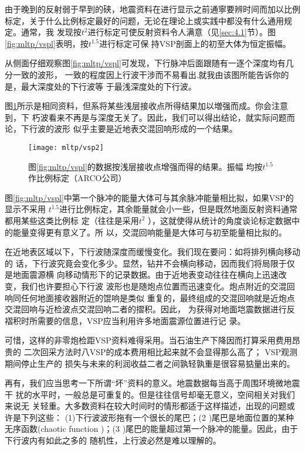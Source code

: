 由于晚到的反射弱于早到的硖，地震资料在进行显示之前通寧要辨时间而加以比例
标定，关于什么比例标定最好的问题，无论在理论上或实践中都没有什么通用规定。通常，我
发现按$t^2$进行标定可使反射资料令人满意（见\ref{sec:4.1}节）。图\ref{fig:mltp/vspl}表明，按$t^{1.5}$进行标定可保
持VSP剖面上的初至大体为恒定振幅。

从侧面仔细观察图\ref{fig:mltp/vspl}可发现，下行脉冲后面跟随有一逐个深度均有几分一致的波形，
一致的程度因上行波干涉而不易看出.就我由该图所能告诉你的是，最大深度处的下行波等
于最浅深度处的下行波。

图\ref{fig:mltp/vsp2}所示是相同资料，但系将某些浅层接收点所得结果加以増强而成。你会注意到，下
朽波看来不再是与深度无关了。因此，我们可以得出结论，就实际问题而论，下行波的波形
似乎主要是近地表交混回响形成的一个结果。
\begin{figure}[H]
\centering
\texttt{[image: mltp/vsp2]}
\caption[vsp2]{
图\ref{fig:mltp/vspl}的数据按浅层接收点增强而得的结果。振幅
均按$t^{1.5}$作比例标定（ARCO公司）
}
\label{fig:mltp/vsp2}
\end{figure}

图\ref{fig:mltp/vspl}中第一个脉冲的能量大体可与其余脉冲能量相比拟，如果VSP的显示不采用
$t^{1.5}$进行比例标定，其余能量就会小一些，但是既然地面反射资料通常都用某些这类比例标
定（往往是采用$t^2$
），这就使得从统计的角度谈论标定数据中的能量变得更有意义了。所
以，交混回响能量是大体可与初至能量相比拟的。

在近地表区域以下，下行波随深度而缓慢变化。我们现在要问：如将排列横向移动的
话，下行波究竟会变化多少。显然，钻井不会横向移动，因而我们将局限于仅是地面震源横
向移动情形下的记录数据。由于近地表变动往往在横向上迅速改变，我们也许要担心下行波
波形也是随炮点位置而迅速变化。炮点附近的交混回响同任何地面接收器附近的馄响是类似
重复的，最终组成的交混回响就是近炮点交混回响与近检波点交混回响二者的摺积。因此，
为获得对地面垲震数据进行反褶积时所需要的信息，VSP应当利用许多地面震源位置进行记
录。

可惜，这样的非零炮检距VSP资料难得采用。当石油生产下降因而打算采用费用昂贵的
二次回采方法时八VSP的成本费用相比起来就不会显得那么高了；
VSP观测期间停止生产的
损失与未来的利润收益二者之间孰轻孰重是很容易掂量出来的。

再有，我们应当思考一下所谓“坏”资料的意义。地震数据每当高于周围环境微地震干
扰的水平时，一般总是可重复的。但是往往信号却毫无意义，空间相关对我们来说无
关轻重。大多数资料在较大时间时的情形都适于这样描述，出现的问题或许是下列这些：
(1)下行波波形拖有一个很长的尾巴；(2
)尾巴是地面位置的某种无序函数(chaotic function )；(3
)尾巴的能量超过第一个脉冲的能量。因此，由于下行波内有如此之多的
随机性，上行波必然是难以理解的。

